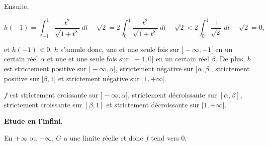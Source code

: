 {{Ensuite, 

$$h(-1)=\int_{-1}^{1}\frac{t^2}{\sqrt{1+t^8}}\;dt-\sqrt{2}=2\int_{0}^{1}\frac{t^2}{\sqrt{1+t^8}}\;dt-\sqrt{2}<2\int_{0}^{1}\frac{1}{\sqrt{2}}\;dt-\sqrt{2}=0,$$

et $h(-1)<0$. $h$ s'annule donc, une et une seule fois sur $]-\infty,-1[$ en un certain réel $\alpha$ et une et une seule fois sur $]-1,0[$ en un certain réel $\beta$. De plus, $h$ est strictement positive sur $]-\infty,\alpha[$, strictement négative sur $]\alpha,\beta[$, strictement positive sur $]\beta,1[$ et strictement négative sur $]1,+\infty[$.

$f$ est strictement croissante sur $]-\infty,\alpha]$, strictement décroissante sur $[\alpha,\beta]$, strictement croissante sur $[\beta,1]$ et strictement décroissante sur $[1,+\infty[$.

\textbf{Etude en l'infini.}

En $+\infty$ ou $-\infty$, $G$ a une limite réelle et donc $f$ tend vers $0$.
}
}

